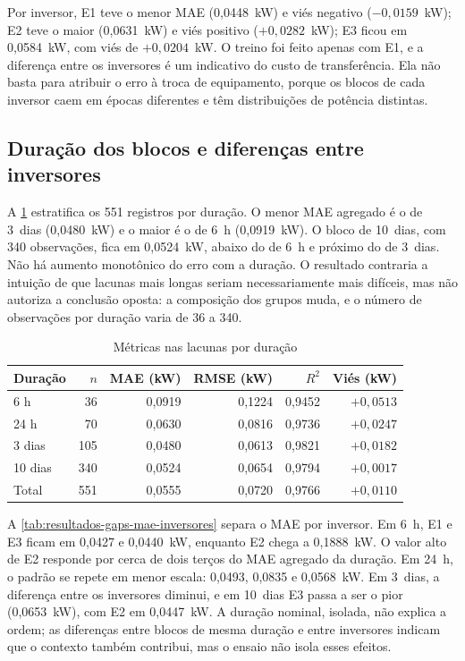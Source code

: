 Por inversor, E1 teve o menor MAE (0,0448~kW) e viés negativo
($-0,0159$~kW); E2 teve o maior (0,0631~kW) e viés positivo
($+0,0282$~kW); E3 ficou em 0,0584~kW, com viés de $+0,0204$~kW. O
treino foi feito apenas com E1, e a diferença entre os inversores é um
indicativo do custo de transferência. Ela não basta para atribuir o
erro à troca de equipamento, porque os blocos de cada inversor caem em
épocas diferentes e têm distribuições de potência distintas.

\subsection{Duração dos blocos e diferenças entre inversores}
\label{sec:resultados-gaps-duracao}

A \cref{tab:resultados-gaps-duracao} estratifica os 551 registros por
duração. O menor MAE agregado é o de 3~dias (0,0480~kW) e o maior é o
de 6~h (0,0919~kW). O bloco de 10~dias, com 340 observações, fica em
0,0524~kW, abaixo do de 6~h e próximo do de 3~dias. Não há aumento
monotônico do erro com a duração. O resultado contraria a intuição de
que lacunas mais longas seriam necessariamente mais difíceis, mas não
autoriza a conclusão oposta: a composição dos grupos muda, e o número
de observações por duração varia de 36 a 340.

\begin{table}[htbp]
    \centering
    \small
    \caption{Métricas nas lacunas por duração}
    \label{tab:resultados-gaps-duracao}
    \begin{tabular}{lrrrrr}
        \toprule
        Duração & $n$ & MAE (kW) & RMSE (kW) & $R^2$ & Viés (kW) \\
        \midrule
        6 h     & 36  & 0,0919 & 0,1224 & 0,9452 & $+0,0513$ \\
        24 h    & 70  & 0,0630 & 0,0816 & 0,9736 & $+0,0247$ \\
        3 dias  & 105 & 0,0480 & 0,0613 & 0,9821 & $+0,0182$ \\
        10 dias & 340 & 0,0524 & 0,0654 & 0,9794 & $+0,0017$ \\
        \midrule
        Total & 551 & 0,0555 & 0,0720 & 0,9766 & $+0,0110$ \\
        \bottomrule
    \end{tabular}
\end{table}

A \cref{tab:resultados-gaps-mae-inversores} separa o MAE por inversor.
Em 6~h, E1 e E3 ficam em 0,0427 e 0,0440~kW, enquanto E2 chega a
0,1888~kW. O valor alto de E2 responde por cerca de dois terços do MAE
agregado da duração. Em 24~h, o padrão se repete em menor escala:
0,0493, 0,0835 e 0,0568~kW. Em 3~dias, a diferença entre os inversores
diminui, e em 10~dias E3 passa a ser o pior (0,0653~kW), com E2 em
0,0447~kW. A duração nominal, isolada, não explica a ordem; as
diferenças entre blocos de mesma duração e entre inversores indicam que
o contexto também contribui, mas o ensaio não isola esses efeitos.

